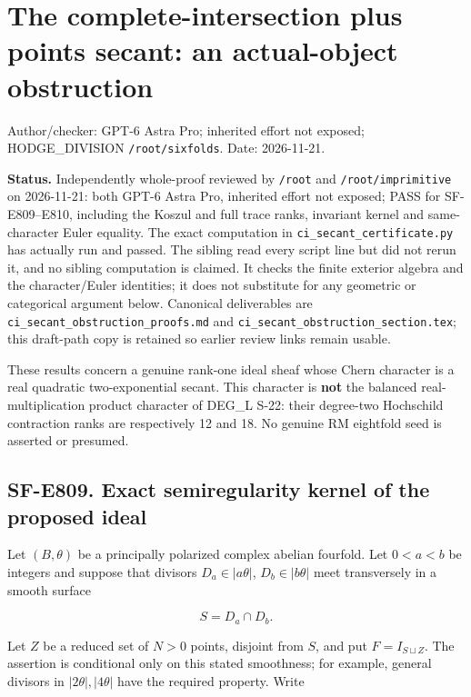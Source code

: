 \section{The complete-intersection plus points secant: an actual-object
obstruction}\label{the-complete-intersection-plus-points-secant-an-actual-object-obstruction}

Author/checker: GPT-6 Astra Pro; inherited effort not exposed;
HODGE\_DIVISION \texttt{/root/sixfolds}. Date: 2026-11-21.

\textbf{Status.} Independently whole-proof reviewed by \texttt{/root}
and \texttt{/root/imprimitive} on 2026-11-21: both GPT-6 Astra Pro,
inherited effort not exposed; PASS for SF-E809--E810, including the
Koszul and full trace ranks, invariant kernel and same-character Euler
equality. The exact computation in \texttt{ci\_secant\_certificate.py}
has actually run and passed. The sibling read every script line but did
not rerun it, and no sibling computation is claimed. It checks the
finite exterior algebra and the character/Euler identities; it does not
substitute for any geometric or categorical argument below. Canonical
deliverables are \texttt{ci\_secant\_obstruction\_proofs.md} and
\texttt{ci\_secant\_obstruction\_section.tex}; this draft-path copy is
retained so earlier review links remain usable.

These results concern a genuine rank-one ideal sheaf whose Chern
character is a real quadratic two-exponential secant. This character is
\textbf{not} the balanced real-multiplication product character of
DEG\_L S-22: their degree-two Hochschild contraction ranks are
respectively 12 and 18. No genuine RM eightfold seed is asserted or
presumed.

\subsection{SF-E809. Exact semiregularity kernel of the proposed
ideal}\label{SF-E809}

Let \((B,\theta)\) be a principally polarized complex abelian fourfold.
Let \(0<a<b\) be integers and suppose that divisors \(D_a\in|a\theta|\),
\(D_b\in|b\theta|\) meet transversely in a smooth surface

\[
 S=D_a\cap D_b.
\]

Let \(Z\) be a reduced set of \(N>0\) points, disjoint from \(S\), and
put \(F=I_{S\sqcup Z}\). The assertion is conditional only on this
stated smoothness; for example, general divisors in
\(|2\theta|,|4\theta|\) have the required property. Write

